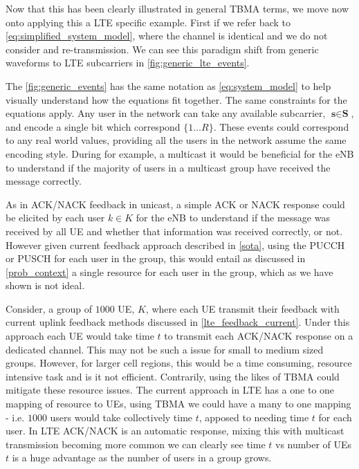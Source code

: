 \documentclass{article}
\begin{document}
Now that this has been clearly illustrated in general TBMA terms, we move now onto applying this a LTE specific example. First if we refer back to \cref{eq:simplified_system_model}, where the channel is identical and we do not consider and re-transmission. We can see this paradigm shift from generic waveforms to LTE subcarriers in \cref{fig:generic_lte_events}.

The \cref{fig:generic_events} has the same notation as \cref{eq:system_model} to help visually understand how the equations fit together. The same constraints for the equations apply. Any user in the network can take any available subcarrier, $\textbf{s} \in \textbf{S}$, and encode a single bit which correspond $\{1\dots R \}$. These events could correspond to any real world values, providing all the users in the network assume the same encoding style. During for example,  a multicast it would be beneficial for the \ac{eNB} to understand if the majority of users in a multicast group have received the message correctly. 

As in ACK/NACK feedback in unicast, a simple ACK or NACK response could be elicited by each user $k \in K$ for the eNB to understand if the message was received by all \ac{UE} and whether that information was received correctly, or not. However given current feedback approach described in \cref{sota}, using the \ac{PUCCH} or \ac{PUSCH} for each user in the group, this would entail as discussed in \cref{prob_context} a single resource for each user in the group, which as we have shown is not ideal.
 
Consider, a group of $1000$ \ac{UE}, $K$, where each UE transmit their feedback with current uplink feedback methods discussed in \cref{lte_feedback_current}. Under this approach each UE would take time $t$ to transmit each ACK/NACK response on a dedicated channel. This may not be such a issue for small to medium sized groups. However, for larger cell regions, this would be a time consuming, resource intensive task and is it not efficient. Contrarily, using the likes of TBMA could mitigate these resource issues. The current approach in LTE has a one to one mapping of resource to UEs, using TBMA we could have a many to one mapping - i.e. $1000$ users would take collectively time $t$, apposed to needing time $t$ for each user. In LTE ACK/NACK is an automatic response, mixing this with multicast transmission becoming more common we can clearly see time $t$ vs number of UEs $t$ is a huge advantage as the number of users in a group grows. 
\end{document}
